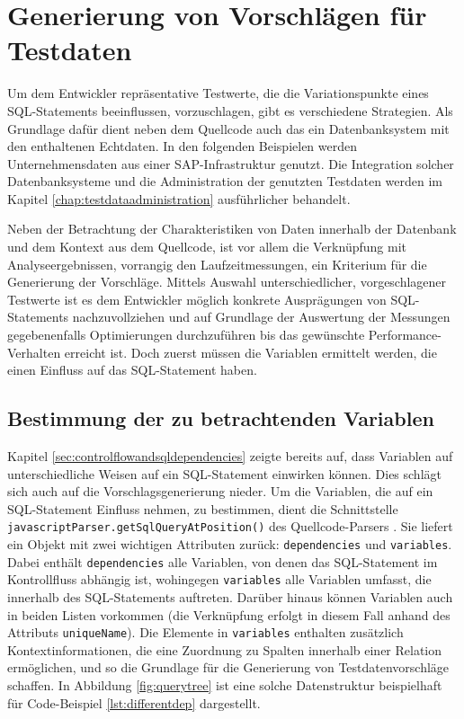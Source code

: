 \section{Generierung von Vorschlägen für Testdaten}\label{chap:testdatasuggestions}

Um dem Entwickler repräsentative Testwerte, die die Variationspunkte eines SQL-Statements beeinflussen, vorzuschlagen, gibt es verschiedene Strategien.
Als Grundlage dafür dient neben dem Quellcode auch das ein Datenbanksystem mit den enthaltenen Echtdaten.
In den folgenden Beispielen werden Unternehmensdaten aus einer SAP-Infrastruktur genutzt.
Die Integration solcher Datenbanksysteme und die Administration der genutzten Testdaten werden im Kapitel \ref{chap:testdataadministration} ausführlicher behandelt.

Neben der Betrachtung der Charakteristiken von Daten innerhalb der Datenbank und dem Kontext aus dem Quellcode, ist vor allem die Verknüpfung mit Analyseergebnissen, vorrangig den Laufzeitmessungen, ein Kriterium für die Generierung der Vorschläge.
Mittels Auswahl unterschiedlicher, vorgeschlagener Testwerte ist es dem Entwickler möglich konkrete Ausprägungen von SQL-Statements nachzuvollziehen und auf Grundlage der Auswertung der Messungen gegebenenfalls Optimierungen durchzuführen bis das gewünschte Performance-Verhalten erreicht ist.
Doch zuerst müssen die Variablen ermittelt werden, die einen Einfluss auf das SQL-Statement haben.

\subsection{Bestimmung der zu betrachtenden Variablen}
Kapitel \ref{sec:controlflowandsqldependencies} zeigte bereits auf, dass Variablen auf unterschiedliche Weisen auf ein SQL-Statement einwirken können.
Dies schlägt sich auch auf die Vorschlagsgenerierung nieder.
Um die Variablen, die auf ein SQL-Statement Einfluss nehmen, zu bestimmen, dient die Schnittstelle \texttt{javascriptParser.getSqlQueryAtPosition()} des Quellcode-Parsers \cite{Horschig2014}.
Sie liefert ein Objekt mit zwei wichtigen Attributen zurück: \texttt{dependencies} und \texttt{variables}.
Dabei enthält \texttt{dependencies} alle Variablen, von denen das SQL-Statement im Kontrollfluss abhängig ist, wohingegen \texttt{variables} alle Variablen umfasst, die innerhalb des SQL-Statements auftreten.
Darüber hinaus können Variablen auch in beiden Listen vorkommen (die Verknüpfung erfolgt in diesem Fall anhand des Attributs \texttt{uniqueName}).
Die Elemente in \texttt{variables} enthalten zusätzlich Kontextinformationen, die eine Zuordnung zu Spalten innerhalb einer Relation ermöglichen, und so die Grundlage für die Generierung von Testdatenvorschläge schaffen.
In Abbildung \ref{fig:querytree} ist eine solche Datenstruktur beispielhaft für Code-Beispiel \ref{lst:differentdep} dargestellt.

